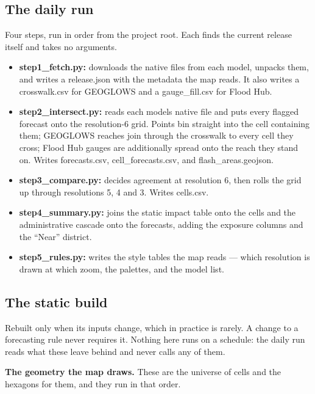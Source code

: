 \subsection{The daily run}\label{the-daily-run}

Four steps, run in order from the project root.
Each finds the current release itself and takes no arguments.

\begin{itemize}
\item
  \textbf{step1\_fetch.py:} downloads the native files from each model, unpacks them, and writes a release.json with the metadata the map reads. It also writes a crosswalk.csv for GEOGLOWS and a gauge\_fill.csv for Flood Hub.
\item
  \textbf{step2\_intersect.py:} reads each model\textquotesingle s native file and puts every flagged forecast onto the resolution-6 grid. Points bin straight into the cell containing them; GEOGLOWS reaches join through the crosswalk to every cell they cross; Flood Hub gauges are additionally spread onto the reach they stand on. Writes forecasts.csv, cell\_forecasts.csv, and flash\_areas.geojson.
\item
  \textbf{step3\_compare.py:} decides agreement at resolution 6, then rolls the grid up through resolutions 5, 4 and 3. Writes cells.csv.
\item
  \textbf{step4\_summary.py:} joins the static impact table onto the cells and the administrative cascade onto the forecasts, adding the exposure columns and the ``Near'' district.
\item
  \textbf{step5\_rules.py:} writes the style tables the map reads --- which resolution is drawn at which zoom, the palettes, and the model list.
\end{itemize}

\subsection{The static build}\label{the-static-build}

Rebuilt only when its inputs change, which in practice is rarely.
A change to a forecasting rule never requires it.
Nothing here runs on a schedule: the daily run reads what these leave behind and never calls any of them.

\textbf{The geometry the map draws.}
These are the universe of cells and the hexagons for them, and they run in that order.

